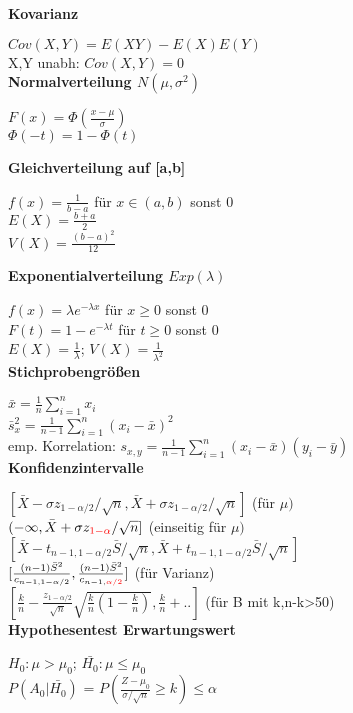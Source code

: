 \documentclass[10pt,twocolumn,a4paper]{article}
\begin{document}
\begin{flushleft}
\textbf{Kovarianz}

$Cov(X, Y) = E(XY) - E(X)E(Y)$\\
X,Y unabh: $Cov(X,Y) = 0$\\

\textbf{Normalverteilung $N(\mu, \sigma^2)$}

$F(x) = \Phi(\frac{x-\mu}{\sigma})$\\
$\Phi(-t) = 1-\Phi(t)$

\textbf{Gleichverteilung auf [a,b]}

$f(x) = \frac{1}{b-a}$ für $x \in (a,b)$ sonst 0\\
$E(X) = \frac{b+a}{2}$\\
$V(X) = \frac{(b-a)^2}{12}$

\textbf{Exponentialverteilung $Exp(\lambda)$}

$f(x) = \lambda e^{-\lambda x}$ für $x \geq 0$ sonst 0\\
$F(t) = 1-e^{-\lambda t}$ für $t \geq 0$ sonst 0\\
$E(X) = \frac{1}{\lambda}$; $V(X) = \frac{1}{\lambda^2}$\\

\textbf{Stichprobengrößen}

$\bar{x} = \frac{1}{n} \sum_{i=1}^{n}x_i$\\
$\bar{s}_x^2 = \frac{1}{n-1} \sum_{i=1}^{n}(x_i-\bar{x})^2$\\
emp. Korrelation: $s_{x,y} = \frac{1}{n-1} \sum_{i=1}^{n}(x_i-\bar{x})(y_i-\bar{y})$\\

\textbf{Konfidenzintervalle}

$[\bar{X}-\sigma z_{1-\alpha/2}/\sqrt{n}, \bar{X}+\sigma z_{1-\alpha/2}/\sqrt{n}]$ (für $\mu)$\\
$(-\infty, \bar{X}+\sigma z_{\textcolor{red}{1-\alpha}}/\sqrt{n}]$ (einseitig für $\mu)$\\
$[\bar{X} - t_{n-1,1-\alpha/2}\bar{S}/\sqrt{n}, \bar{X} + t_{n-1,1-\alpha/2}\bar{S}/\sqrt{n}]$\\
$[\frac{(n-1)\bar{S}^2}{c_{n-1,1-\alpha/2}},\frac{(n-1)\bar{S}^2}{c_{n-1,\textcolor{red}{\alpha/2}}}]$ (für Varianz)\\
$[\frac{k}{n}-\frac{z_{1-\alpha/2}}{\sqrt{n}}\sqrt{\frac{k}{n}(1-\frac{k}{n})}, \frac{k}{n}+..]$ (für B mit k,n-k>50)\\

\textbf{Hypothesentest Erwartungswert}

$H_0: \mu > \mu_0$; $\bar{H_0}: \mu \leq \mu_0$\\
$P(A_0|\bar{H_0})$ = $P(\frac{Z-\mu_0}{\sigma/\sqrt{n}} \geq k) \leq \alpha$\\


\end{flushleft}
\end{document}
